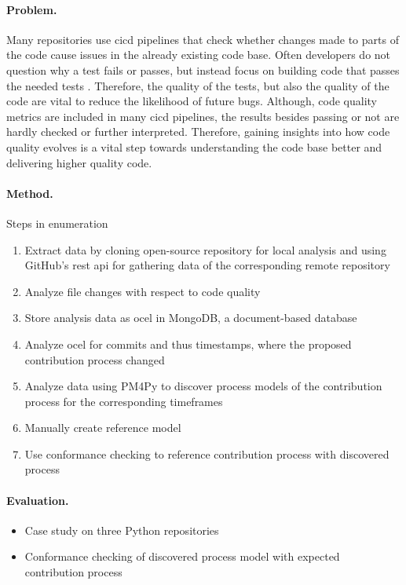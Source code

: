 \paragraph{Problem.} Many repositories use \ac{cicd} pipelines that check whether changes made to parts of the code cause issues in the already existing code base. Often developers do not question why a test fails or passes, but instead focus on building code that passes the needed tests \autocite{DBLP:conf/icsm/ElazharySEZ19}. Therefore, the quality of the tests, but also the quality of the code are vital to reduce the likelihood of future bugs. Although, code quality metrics are included in many \ac{cicd} pipelines, the results besides passing or not are hardly checked or further interpreted. Therefore, gaining insights into how code quality evolves is a vital step towards understanding the code base better and delivering higher quality code.

\paragraph{Method.} Steps in enumeration
\begin{enumerate}
	\item Extract data by cloning open-source repository for local analysis and using GitHub's \ac{rest api} for gathering data of the corresponding remote repository
	\item Analyze file changes with respect to code quality
	\item Store analysis data as \ac{ocel} in MongoDB, a document-based database
	\item Analyze \ac{ocel} for commits and thus timestamps, where the proposed contribution process changed
	\item Analyze data using PM4Py to discover process models of the contribution process for the corresponding timeframes
	\item Manually create reference model
	\item Use conformance checking to reference contribution process with discovered process
\end{enumerate}

\paragraph{Evaluation.} 
\begin{itemize}
	\item Case study on three Python repositories
	\item Conformance checking of discovered process model with expected contribution process
\end{itemize} 

